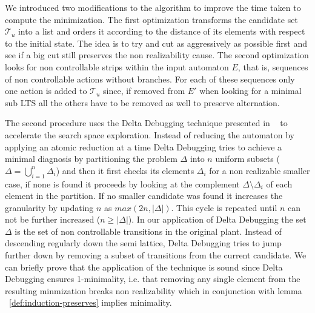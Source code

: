 We introduced two modifications to the algorithm
to improve the time taken to compute the minimization.
The first optimization transforms the candidate set $\mathcal{T}_u$
into a list and orders it according to the distance of its elements 
with respect to the initial state.  The idea is to try and cut
as aggressively as possible first and see if a big cut still
preserves the non realizability cause.  The second optimization
looks for non controllable strips within the  input automaton
$E$, that is, sequences of non controllable actions without branches.
For each of these sequences only one action is
added to $\mathcal{T}_u$ since, if removed from $E'$
when looking for a minimal sub LTS all the others have to be removed
as well to preserve alternation.



The second procedure uses the Delta Debugging technique presented in ~\cite{DBLP:journals/tse/ZellerH02} to accelerate the search space exploration. Instead of reducing the automaton by applying an atomic reduction at a time Delta Debugging tries to achieve a minimal diagnosis by partitioning the problem $\Delta$ into $n$ uniform subsets ($\Delta = \bigcup_{i=1}^n \Delta_i $) and then it first checks its elements $\Delta_i$ for a non realizable smaller case, if none is found it proceeds by looking at the complement $\Delta \setminus \Delta_i$ of each element in the partition. If no smaller candidate was found it increases the granularity by updating $n$ as $max(2n,|\Delta|)$. This cycle is repeated until $n$ can not be further increased ($n \geq |\Delta|$). 
In our application of Delta Debugging the set $\Delta$ is the set of non controllable transitions in the original plant. Instead of descending regularly down the semi lattice, Delta Debugging tries to jump further down by removing a subset of transitions from the current candidate. We can briefly prove that the application of the technique is sound since Delta Debugging ensures 1-minimality, i.e. that removing any single element from the resulting minmization breaks non realizability which in conjunction with lemma ~\ref{def:induction-preserves} implies minimality.
